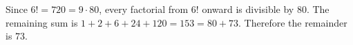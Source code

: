 Since $6!=720=9\cdot80$, every factorial from $6!$ onward is divisible by $80$. The remaining sum is $1+2+6+24+120=153=80+73$. Therefore the remainder is $\boxed{73}$.
